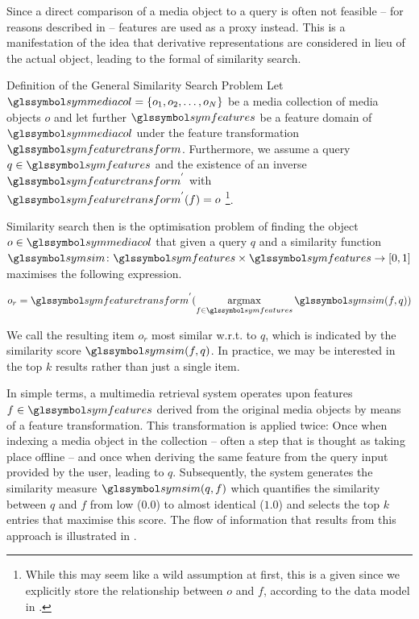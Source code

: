 Since a direct comparison of a media object to a query is often not feasible -- for reasons described in  -- features are used as a proxy instead. This is a manifestation of the idea that derivative representations are considered in lieu of the actual object, leading to the formal  of similarity search.

\begin{definition}[label=definition:similarity_search]{Definition of the General Similarity Search Problem}{}
    Let $\symmediacol = \lbrace o_1, o_2, \ldots, o_N \rbrace$ be a media collection of media objects $o$ and let further $\symfeatures$ be a feature domain of $\symmediacol$ under the feature transformation $\symfeaturetransform$. Furthermore, we assume a query $q \in \symfeatures$ and the existence of an inverse $\symfeaturetransform^{'}$ with $\symfeaturetransform^{'}(f) = o$ \footnote{While this may seem like a wild assumption at first, this is a given since we explicitly store the relationship between $o$ and $f$, according to the data model in .}.

    Similarity search then is the optimisation problem of finding the object $o \in \symmediacol$ that given a query $q$ and a similarity function $\symsim \colon \symfeatures \times \symfeatures \rightarrow [0, 1]$ maximises the following expression.

    \begin{equation}
       o_r =  \symfeaturetransform^{'} (\argmax_{f \in \symfeatures} \symsim(f,q))
    \end{equation}
 
    We call the resulting item $o_r$ most similar w.r.t. to $q$, which is indicated by the similarity score $\symsim(f,q)$. In practice, we may be interested in the top $k$ results rather than just a single item.
\end{definition}

In simple terms, a multimedia retrieval system operates upon features $f \in \symfeatures$ derived from the original media objects by means of a feature transformation. This transformation is applied twice: Once when indexing a media object in the collection -- often a step that is thought as taking place offline -- and once when deriving the same feature from the query input provided by the user, leading to $q$. Subsequently, the system generates the similarity measure $\symsim(q,f)$ which quantifies the similarity between $q$ and $f$ from low ($0.0$) to almost identical ($1.0$) and selects the top $k$ entries that maximise this score. The flow of information that results from this approach is illustrated in . 

